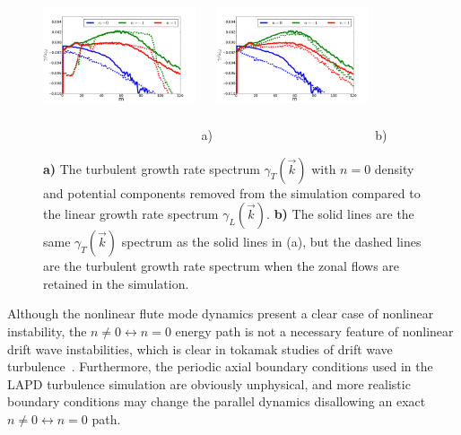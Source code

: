 \documentclass[showpacs,preprintnumbers,amsmath,amssymb,superscriptaddress]{revtex4}
\begin{document}
\begin{figure}[!htbp]
\includegraphics[width=0.40\textwidth,height=50mm]{non0_vs_lin}~a)
\hfil
\includegraphics[width=0.40\textwidth,height=50mm]{non0_vs_withzf}~b)
\hfil
\caption{\textbf{a)} The turbulent growth rate spectrum $\gamma_T(\vec{k})$ with $n=0$ density and potential components removed from the 
simulation compared to the linear growth rate spectrum $\gamma_L(\vec{k})$.
\textbf{b)} The solid lines are the same $\gamma_T(\vec{k})$ spectrum as the solid lines in (a), but the dashed lines are the turbulent growth rate spectrum when the zonal flows are retained
in the simulation.}
\label{gamma_no_n0_figs}
\end{figure}


Although the nonlinear flute mode dynamics present a clear case of nonlinear instability, the $n \ne 0 \leftrightarrow n=0$ energy path is not a necessary feature of nonlinear drift wave
instabilities, which is clear in tokamak studies of drift wave turbulence~\cite{zeiler1996,zeiler1997,scott2002,scott2003,scott2005}. Furthermore, the periodic axial boundary conditions
used in the LAPD turbulence simulation are obviously unphysical, and more realistic boundary conditions may change the parallel dynamics disallowing an exact $n \ne 0 \leftrightarrow n=0$ path.
\end{document}
